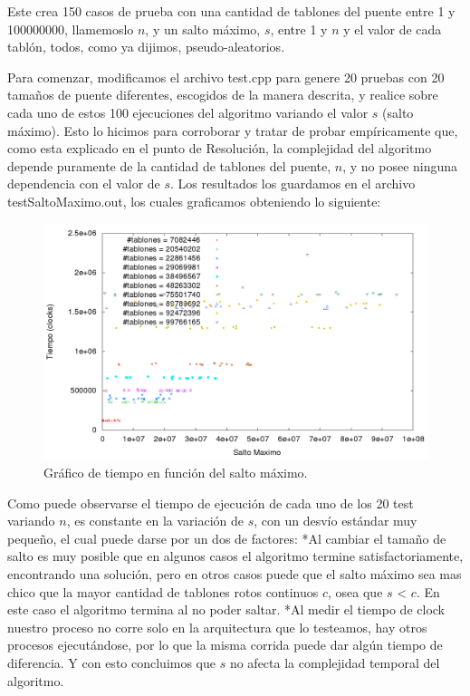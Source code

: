 Este crea 150 casos de prueba con una cantidad de tablones del puente entre 1 y 100000000, llamemoslo $n$, y un salto máximo, $s$, entre 1 y $n$ y el valor de cada tablón, todos, como ya dijimos, pseudo-aleatorios.

Para comenzar, modificamos el archivo test.cpp para genere 20 pruebas con 20 tamaños de puente diferentes, escogidos de la manera descrita, y realice sobre cada uno de estos 100 ejecuciones del algoritmo variando el valor $s$ (salto máximo).
Esto lo hicimos para corroborar y tratar de probar empíricamente que, como esta explicado en el punto de Resolución, la complejidad del algoritmo depende puramente de la cantidad de tablones del puente, $n$, y no posee ninguna dependencia con el valor de $s$.
Los resultados los guardamos en el archivo testSaltoMaximo.out, los cuales graficamos obteniendo lo siguiente:


\begin{figure}[H]
\begin{center}
\includegraphics[scale=.45]{./imagenes/ej1_testSaltoMaximo.png}
\caption{Gr\'afico de tiempo en funci\'on del salto m\'aximo.}
\end{center}
\end{figure}


Como puede observarse el tiempo de ejecución de cada uno de los 20 test variando $n$, es constante en la variación de $s$, con un desvío estándar muy pequeño, el cual puede darse por un dos de factores: 
*Al cambiar el tamaño de salto es muy posible que en algunos casos el algoritmo termine satisfactoriamente, encontrando una solución, pero en otros casos puede que el salto máximo sea mas chico que la mayor cantidad de tablones rotos continuos $c$, osea que $s$ < $c$. En este caso el algoritmo termina al no poder saltar.
*Al medir el tiempo de clock nuestro proceso no corre solo en la arquitectura que lo testeamos, hay otros procesos ejecutándose, por lo que la misma corrida puede dar algún tiempo de diferencia.
Y con esto concluimos que $s$ no afecta la complejidad temporal del algoritmo.

